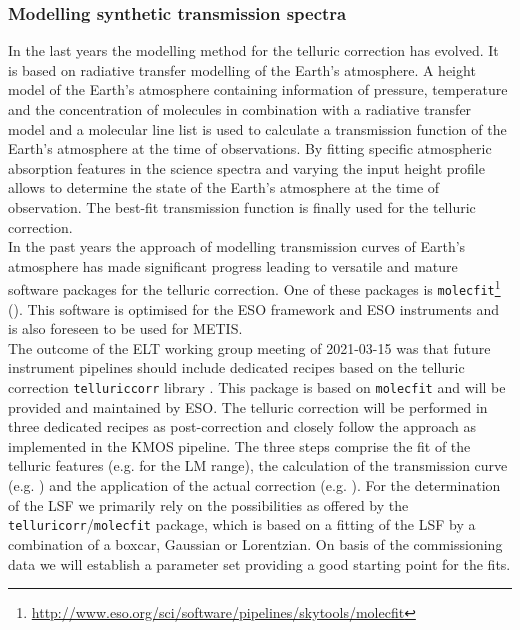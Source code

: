 \subsubsection{Modelling synthetic transmission spectra}
In the last years the modelling method for the telluric correction has evolved. It is based on radiative transfer modelling of the Earth's atmosphere. A height model of the Earth's atmosphere containing information of pressure, temperature and the concentration of molecules in combination with a radiative transfer model and a molecular line list is used to calculate a transmission function of the Earth's atmosphere at the time of observations. By fitting specific atmospheric absorption features in the science spectra and varying the input height profile allows to determine the state of the Earth's atmosphere at the time of observation. The best-fit transmission function is finally used for the telluric correction.\\
In the past years the approach of modelling transmission curves of Earth's atmosphere has made significant progress leading to versatile and mature software packages for the telluric correction. One of these packages is \texttt{molecfit}\footnote{\url{http://www.eso.org/sci/software/pipelines/skytools/molecfit}} (\cite{mf1, mf2, molecfit}). This software is optimised for the ESO framework and ESO instruments and is also foreseen to be used for \ac{METIS}.\\
The outcome of the \ac{ELT} working group meeting of 2021-03-15 was that future instrument pipelines should include dedicated recipes based on the telluric correction \texttt{telluriccorr} library \cite{telluriccorr}. This package is based on \texttt{molecfit} and will be provided and maintained by \ac{ESO}. The telluric correction will be performed in three dedicated recipes as post-correction   and closely follow the approach as implemented in the \ac{KMOS} pipeline. The three steps comprise the fit of the telluric features (e.g. \hyperref[rec:metis_lm_lss_mf_model]{} for the LM range), the calculation of the transmission curve (e.g. \hyperref[rec:metis_lm_lss_mf_calctrans]{}) and the application of the actual correction (e.g. \hyperref[rec:metis_lm_lss_mf_correct]{}). For the determination of the \ac{LSF} we primarily rely on the possibilities as offered by the \texttt{telluricorr}/\texttt{molecfit} package, which is based on a fitting of the \ac{LSF} by a combination of a boxcar, Gaussian or Lorentzian. On basis of the commissioning data we will establish a parameter set providing a good starting point for the fits.\\
